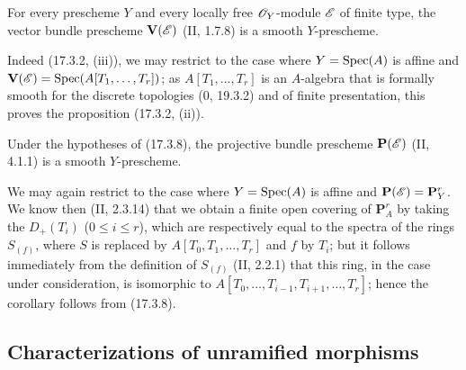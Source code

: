 \begin{proposition}[17.3.8]
\label{IV.17.3.8}
For every prescheme $Y$ and every locally free $\mathscr{O}_Y$-module $\mathscr{E}$ of finite type, the vector bundle prescheme $\mathbf{V}(\mathscr{E})$ (II, 1.7.8) is a smooth $Y$-prescheme.
\end{proposition}

Indeed (17.3.2, (iii)), we may restrict to the case where $Y=\operatorname{Spec}(A)$ is affine and $\mathbf{V}(\mathscr{E})=\operatorname{Spec}(A[T_1,\ldots,T_r])$; as $A[T_1,\ldots,T_r]$ is an $A$-algebra that is formally smooth for the discrete topologies (0, 19.3.2) and of finite presentation, this proves the proposition (17.3.2, (ii)).

\begin{corollary}[17.3.9]
\label{IV.17.3.9}
Under the hypotheses of (17.3.8), the projective bundle prescheme $\mathbf{P}(\mathscr{E})$ (II, 4.1.1) is a smooth $Y$-prescheme.
\end{corollary}

We may again restrict to the case where $Y=\operatorname{Spec}(A)$ is affine and $\mathbf{P}(\mathscr{E})=\mathbf{P}^r_Y$. We know then (II, 2.3.14) that we obtain a finite open covering of $\mathbf{P}^r_A$ by taking the $D_+(T_i)$ ($0\leq i\leq r$), which are respectively equal to the spectra of the rings $S_{(f)}$, where $S$ is replaced by $A[T_0,T_1,\ldots,T_r]$ and $f$ by $T_i$; but it follows immediately from the definition of $S_{(f)}$ (II, 2.2.1) that this ring, in the case under consideration, is isomorphic to $A[T_0,\ldots,T_{i-1},T_{i+1},\ldots,T_r]$; hence the corollary follows from (17.3.8).


\subsection{Characterizations of unramified morphisms}

